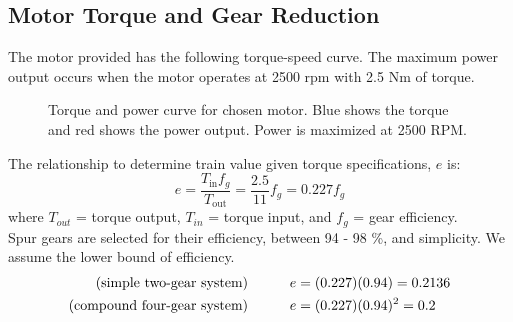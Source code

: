 \documentclass[letterpaper,12pt]{article}
\begin{document}
\subsection{Motor Torque and Gear Reduction}
The motor provided has the following torque-speed curve. The maximum power output occurs when the motor operates at 2500 rpm with 2.5 Nm of torque. \\

\begin{figure}[htbp] 
    \centering 
{}
\caption{Torque and power curve for chosen motor. Blue shows the torque and red shows the power output. Power is maximized at 2500 RPM.}
\end{figure}
\noindent The relationship to determine train value given torque specifications, $e$ is:
\begin{equation}
e = \frac{T_{\text{in}}f_{g}}{T_{\text{out}}} = \frac{2.5}{11} f_{g} = 0.227f_g
\end{equation}
where $T_{out}$ = torque output, $T_{in}$ = torque input, and $f_g$ = gear efficiency. \\
Spur gears are selected for their efficiency, between 94 - 98 \%, and simplicity. We assume the lower bound of efficiency. 
\begin{eqnarray}
\text{(simple two-gear system)}    \indent\indent &e = (0.227)(0.94) = 0.2136\\
\text{(compound four-gear system)} \indent\indent &e = (0.227)(0.94)^2 = 0.2 
\end{eqnarray}
\end{document}
